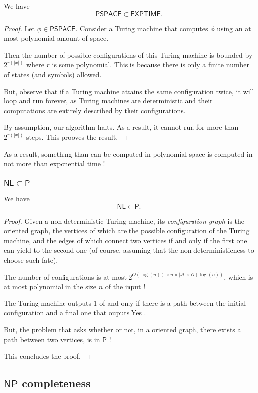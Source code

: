 \begin{proposition}
    We have 
    \[
        \mathsf{PSPACE} \subset \mathsf{EXPTIME}.
    \]
\end{proposition}

\begin{proof}
    Let $ \phi \in \mathsf{PSPACE} $. Consider a Turing machine that computes $ \phi $ using an at most polynomial amount of space.

    Then the number of possible configurations of this Turing machine is bounded by $ 2^{r(|x|)} $ where $ r $ is some polynomial. This is because there is only a finite number of states (and symbols) allowed.

    But, observe that if a Turing machine attains the same configuration twice, it will loop and run forever, as Turing machines are deterministic and their computations are entirely described by their configurations.

    By assumption, our algorithm halts. As a result, it cannot run for more than $ 2^{r(|x|)} $ steps. This prooves the result.
\end{proof}

As a result, something than can be computed in polynomial space is computed in not more than exponential time !

\subsubsection{$ \mathsf{NL} \subset \mathsf P $}

\begin{proposition}
    We have
    \[
        \mathsf{NL} \subset \mathsf P.
    \]
\end{proposition}

\begin{proof}
    Given a non-deterministic Turing machine, its \textit{configuration graph} is the oriented graph, the vertices of which are the possible configuration of the Turing machine, and the edges of which connect two vertices if and only if the first one can yield to the second one (of course, assuming that the non-deterministicness to choose such fate).

    The number of configurations is at most $ 2^{O(\log(n)) \times n \times | \mathcal A | \times O(\log(n))} $, which is at most polynomial in the size $ n $ of the input !

    The Turing machine outputs $ 1 $ of and only if there is a path between the initial configuration and a final one that ouputs \og Yes \fg.

    But, the problem that asks whether or not, in a oriented graph, there exists a path between two vertices, is in $ \mathsf P $ !

    This concludes the proof.
\end{proof}

\subsection{$ \mathsf{NP} $ completeness}

\begin{theorem}
    
\end{theorem}

\begin{definition}

\end{definition}

